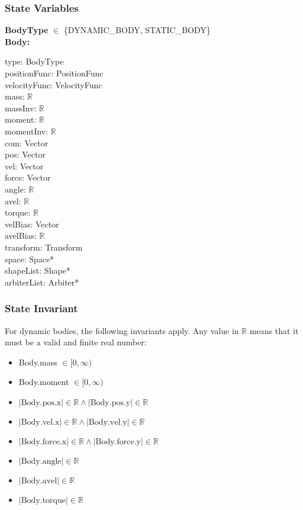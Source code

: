 \documentclass[12pt]{article}
\newcommand{\R}{$\mathbb{R}$}
\begin{document}
\subsubsection{State Variables} \label{SecSVBody}
	\textbf{BodyType} $\in$ \{DYNAMIC_BODY, STATIC_BODY\} \\ 
	\newline
	\textbf{Body:} 
	 \begin{multicols}{3}
		\noindent type: BodyType \\
		positionFunc: PositionFunc \\
		velocityFunc: VelocityFunc \\
		mass: \R \\
		massInv: \R \\
		moment: \R \\
		momentInv: \R \\
		com: Vector \\
		pos: Vector \\
		vel: Vector \\
		force: Vector \\
		angle: \R \\
		avel: \R \\
		torque: \R \\
		velBias: Vector \\
		avelBias: \R \\
		transform: Transform \\
		space: Space* \\
		shapeList: Shape* \\
		arbiterList: Arbiter* 
	\end{multicols}
	
\subsubsection{State Invariant} \label{SecSIBody}
	For dynamic bodies, the following invariants apply. Any value in $\mathbb{R}$ means that it must be a valid and finite real number: 
	\begin{itemize}
	\item Body.mass $\in [0, \infty)$ 
	\item Body.moment $\in [0, \infty)$ 
	\item $|\text{Body.pos.x}| \in \mathbb{R} \wedge |\text{Body.pos.y}| \in \mathbb{R}$ 
	\item $|\text{Body.vel.x}| \in \mathbb{R} \wedge |\text{Body.vel.y}| \in \mathbb{R}$ 	
	\item $|\text{Body.force.x}| \in \mathbb{R} \wedge |\text{Body.force.y}| \in \mathbb{R}$ 
	\item $|\text{Body.angle}| \in \mathbb{R}$  
	\item $|\text{Body.avel}| \in \mathbb{R}$  
	\item $|\text{Body.torque}| \in \mathbb{R}$
	\end{itemize}
	
\end{document}
